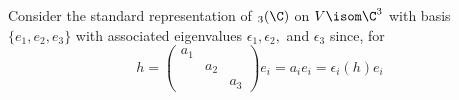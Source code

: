 \documentclass[11pt,leqno,oneside]{amsart}
\numberwithin{thm}{section}
\begin{document}
\begin{example}
  Consider the standard representation of \(\sl_3(\C)\) on \(V \isom
  \C^3\) with basis \(\{e_1,e_2,e_3\}\) with associated eigenvalues
  \(\epsilon_1, \epsilon_2, \)  and \(\epsilon_3\) since, for \[
    h = \left(
      \begin{array}{ccc}
        a_1&&\\
           &a_2&\\
        &&a_3
      \end{array}
\right) e_i = a_i e_i = \epsilon_i(h) e_i
  \]
  \begin{figure}[h]
    \centering
\end{figure}
\end{example}
\end{document}
